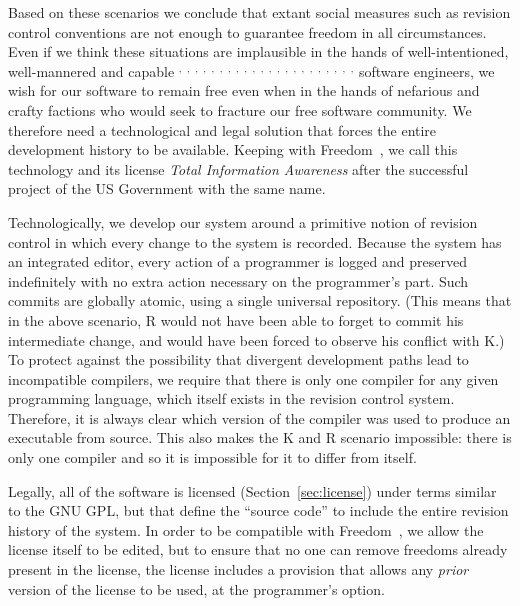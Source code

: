 \documentclass[twocolumn]{article}
\begin{document}
Based on these scenarios we conclude that extant social measures such
as revision control conventions are not enough to guarantee freedom
in all circumstances.
Even if we think these situations are implausible in the hands of
well-intentioned, well-mannered and capable%
%
$^,$%
$^,$%
$^,$%
$^,$%
$^,$%
$^,$%
$^,$%
$^,$%
$^,$%
$^,$%
$^,$%
$^,$%
$^,$%
$^,$%
$^,$%
$^,$%
$^,$%
$^,$%
$^,$%
$^,$%
$^,$%
$^,$%
%
software engineers, we wish for our software to remain free even when
in the hands of nefarious and crafty factions who would seek to
fracture our free software
community. We therefore need a technological and legal solution that
forces the entire development history to be available. Keeping with
Freedom~\fusa, we call this technology and its license {\em Total
Information Awareness} after the successful project of the US
Government with the same name.\z{}

Technologically, we develop our system around a primitive notion of
revision control in which every change to the system is recorded.
Because the system has an integrated editor, every action of a
programmer is logged and preserved indefinitely with no extra action
necessary on the programmer's part. Such commits are globally atomic,
using a single universal repository. (This means that in the above
scenario, R would not have been able to forget to commit his
intermediate change, and would have been forced to observe his
conflict with K.) To protect against the possibility that divergent
development paths lead to incompatible compilers, we require that
there is only one compiler for any given programming language, which
itself exists in the revision control system. Therefore, it is always
clear which version of the compiler was used to produce an executable
from source. This also makes the K and R scenario impossible: there is
only one compiler and so it is impossible for it to differ from
itself.

Legally, all of the software is licensed (Section~\ref{sec:license})
under terms similar to the GNU GPL, but that define the ``source
code'' to include the entire revision history of the system. In order
to be compatible with Freedom~\ffree, we allow the license itself to be
edited, but to ensure that no one can remove freedoms already present
in the license, the license includes a provision that allows any {\em
prior} version of the license to be used, at the programmer's option.
\end{document}
